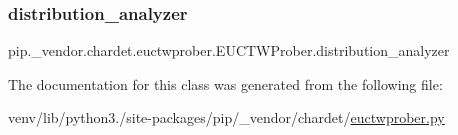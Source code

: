 \subsubsection{\texorpdfstring{distribution\+\_\+analyzer}{distribution\_analyzer}}
{\footnotesize\ttfamily pip.\+\_\+vendor.\+chardet.\+euctwprober.\+E\+U\+C\+T\+W\+Prober.\+distribution\+\_\+analyzer}



The documentation for this class was generated from the following file\+:\begin{DoxyCompactItemize}
\item 
venv/lib/python3./site-\/packages/pip/\+\_\+vendor/chardet/\hyperlink{euctwprober_8py}{euctwprober.\+py}\end{DoxyCompactItemize}
